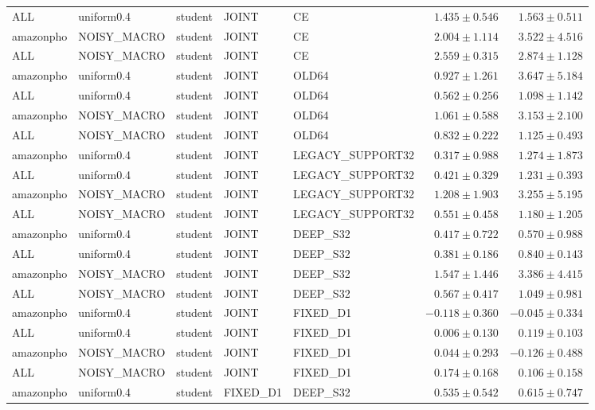 \begin{longtable}{lllllrr}
ALL & uniform0.4 & student & JOINT & CE & $1.435 \pm 0.546$ & $1.563 \pm 0.511$ \\
amazonpho & NOISY\_MACRO & student & JOINT & CE & $2.004 \pm 1.114$ & $3.522 \pm 4.516$ \\
ALL & NOISY\_MACRO & student & JOINT & CE & $2.559 \pm 0.315$ & $2.874 \pm 1.128$ \\
amazonpho & uniform0.4 & student & JOINT & OLD64 & $0.927 \pm 1.261$ & $3.647 \pm 5.184$ \\
ALL & uniform0.4 & student & JOINT & OLD64 & $0.562 \pm 0.256$ & $1.098 \pm 1.142$ \\
amazonpho & NOISY\_MACRO & student & JOINT & OLD64 & $1.061 \pm 0.588$ & $3.153 \pm 2.100$ \\
ALL & NOISY\_MACRO & student & JOINT & OLD64 & $0.832 \pm 0.222$ & $1.125 \pm 0.493$ \\
amazonpho & uniform0.4 & student & JOINT & LEGACY\_SUPPORT32 & $0.317 \pm 0.988$ & $1.274 \pm 1.873$ \\
ALL & uniform0.4 & student & JOINT & LEGACY\_SUPPORT32 & $0.421 \pm 0.329$ & $1.231 \pm 0.393$ \\
amazonpho & NOISY\_MACRO & student & JOINT & LEGACY\_SUPPORT32 & $1.208 \pm 1.903$ & $3.255 \pm 5.195$ \\
ALL & NOISY\_MACRO & student & JOINT & LEGACY\_SUPPORT32 & $0.551 \pm 0.458$ & $1.180 \pm 1.205$ \\
amazonpho & uniform0.4 & student & JOINT & DEEP\_S32 & $0.417 \pm 0.722$ & $0.570 \pm 0.988$ \\
ALL & uniform0.4 & student & JOINT & DEEP\_S32 & $0.381 \pm 0.186$ & $0.840 \pm 0.143$ \\
amazonpho & NOISY\_MACRO & student & JOINT & DEEP\_S32 & $1.547 \pm 1.446$ & $3.386 \pm 4.415$ \\
ALL & NOISY\_MACRO & student & JOINT & DEEP\_S32 & $0.567 \pm 0.417$ & $1.049 \pm 0.981$ \\
amazonpho & uniform0.4 & student & JOINT & FIXED\_D1 & $-0.118 \pm 0.360$ & $-0.045 \pm 0.334$ \\
ALL & uniform0.4 & student & JOINT & FIXED\_D1 & $0.006 \pm 0.130$ & $0.119 \pm 0.103$ \\
amazonpho & NOISY\_MACRO & student & JOINT & FIXED\_D1 & $0.044 \pm 0.293$ & $-0.126 \pm 0.488$ \\
ALL & NOISY\_MACRO & student & JOINT & FIXED\_D1 & $0.174 \pm 0.168$ & $0.106 \pm 0.158$ \\
amazonpho & uniform0.4 & student & FIXED\_D1 & DEEP\_S32 & $0.535 \pm 0.542$ & $0.615 \pm 0.747$ \\

\end{longtable}
